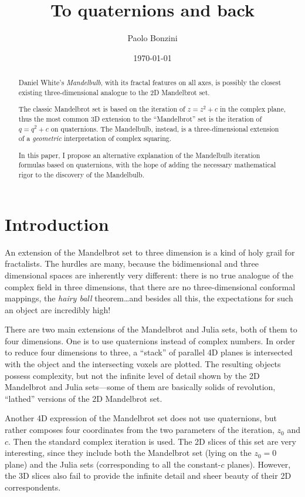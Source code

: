 \documentclass{article}
\title{To quaternions and back}
\date{\today}
\author{Paolo Bonzini}
\begin{document}
\maketitle


\begin{abstract}
  Daniel White's \emph{Mandelbulb}, with its fractal features on all
  axes, is possibly the closest existing three-dimensional analogue
  to the 2D Mandelbrot set.

  The classic Mandelbrot set is based on the iteration of $z=z^2+c$ in
  the complex plane, thus the most common 3D extension to the
  ``Mandelbrot'' set is the iteration of $q=q^2+c$ on quaternions.
  The Mandelbulb, instead, is a three-dimensional extension of a
  \emph{geometric} interpretation of complex squaring.
  
  In this paper, I propose an alternative explanation of the Mandelbulb
  iteration formulas based on quaternions, with the hope of adding the
  necessary mathematical rigor to the discovery of the Mandelbulb.
\end{abstract}

\section{Introduction}

An extension of the Mandelbrot set to three dimension is a kind of
holy grail for fractalists.  The hurdles are many, because the
bidimensional and three dimensional spaces are inherently very
different: there is no true analogue of the complex field in three
dimensions, that there are no three-dimensional conformal mappings,
the \emph{hairy ball} theorem\dots and besides all this, the
expectations for such an object are incredibly high!

There are two main extensions of the Mandelbrot and Julia sets, both
of them to four dimensions.  One is to use quaternions instead of
complex numbers.  In order to reduce four dimensions to three, a
``stack'' of parallel 4D planes is intersected with the object and the
intersecting voxels are plotted.  The resulting objects possess
complexity, but not the infinite level of detail shown by the 2D
Mandelbrot and Julia sets---some of them are basically solids of
revolution, ``lathed'' versions of the 2D Mandelbrot set.

Another 4D expression of the Mandelbrot set does not use quaternions,
but rather composes four coordinates from the two parameters of
the iteration, $z_0$ and $c$.  Then the standard complex iteration
is used.  The 2D slices of this set are very interesting, since
they include both the Mandelbrot set (lying on the $z_0=0$ plane)
and the Julia sets (corresponding to all the constant-$c$ planes).
However, the 3D slices also fail to provide the infinite detail
and sheer beauty of their 2D correspondents.
\end{document}
